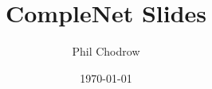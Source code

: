 \documentclass{beamer}
\title{CompleNet Slides}
\date{\today}
\author{Phil Chodrow}
\institute{MIT Human Mobility and Networks Laboratory \alert|\alert| Operations Research Center}
\begin{document}

\newif\iflong
\ifdefined\short
	\longfalse
\else
	\longtrue
\fi



\maketitle
\end{document}
